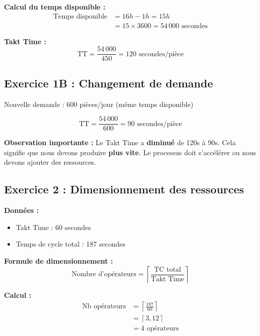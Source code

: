 \documentclass[12pt,a4paper]{article}
\begin{document}
\textbf{Calcul du temps disponible :}
\begin{align*}
    \text{Temps disponible} &= 16h - 1h = 15h \\
    &= 15 \times 3600 = 54\,000 \text{ secondes}
\end{align*}

\textbf{Takt Time :}
\begin{equation*}
    \boxed{\text{TT} = \frac{54\,000}{450} = 120 \text{ secondes/pièce}}
\end{equation*}

\subsection{Exercice 1B : Changement de demande}

Nouvelle demande : 600 pièces/jour (même temps disponible)

\begin{equation*}
    \boxed{\text{TT} = \frac{54\,000}{600} = 90 \text{ secondes/pièce}}
\end{equation*}

\begin{tcolorbox}[pedagogique]
\textbf{Observation importante :} Le Takt Time a \textbf{diminué} de 120s à 90s. Cela signifie que nous devons produire \textbf{plus vite}. Le processus doit s'accélérer ou nous devons ajouter des ressources.
\end{tcolorbox}

\subsection{Exercice 2 : Dimensionnement des ressources}

\textbf{Données :}
\begin{itemize}
    \item Takt Time : 60 secondes
    \item Temps de cycle total : 187 secondes
\end{itemize}

\textbf{Formule de dimensionnement :}
\begin{equation}
    \text{Nombre d'opérateurs} = \left\lceil \frac{\text{TC total}}{\text{Takt Time}} \right\rceil
\end{equation}

\textbf{Calcul :}
\begin{align*}
    \text{Nb opérateurs} &= \left\lceil \frac{187}{60} \right\rceil \\
    &= \left\lceil 3{,}12 \right\rceil \\
    &= \boxed{4 \text{ opérateurs}}
\end{align*}
\end{document}
